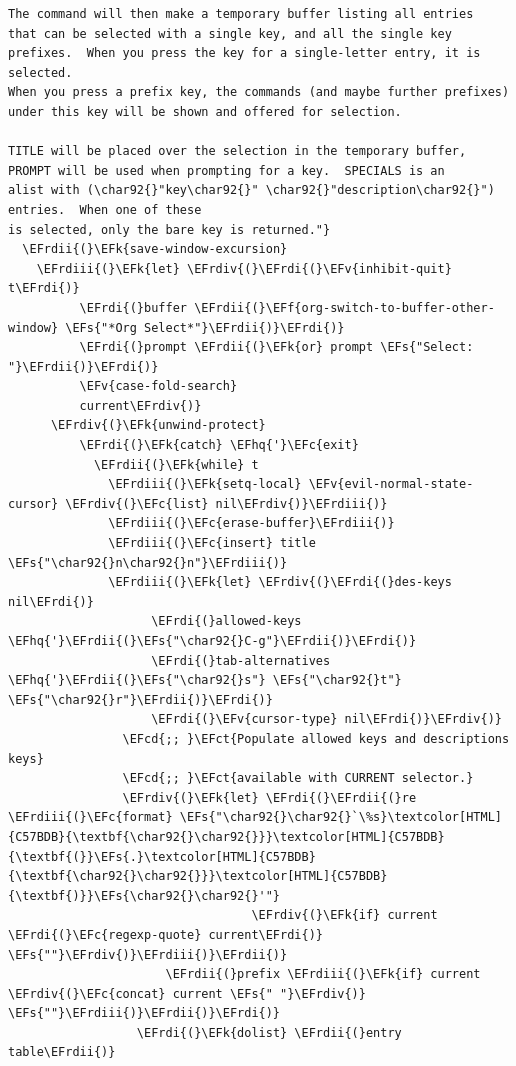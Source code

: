 \documentclass{scrartcl}
\newcommand{\EFk}[1]{\textcolor{EFk}{#1}} %
\newcommand{\EFs}[1]{\textcolor{EFs}{#1}} %
\newcommand{\EFct}[1]{\textcolor{EFct}{#1}} %
\newcommand{\EFc}[1]{\textcolor{EFc}{#1}} %
\newcommand{\EFv}[1]{\textcolor{EFv}{#1}} %
\newcommand{\EFf}[1]{\textcolor{EFf}{#1}} %
\newcommand{\EFcd}[1]{\textcolor{EFcd}{#1}} %
\newcommand{\EFhq}[1]{#1} %
\newcommand{\EFrdi}[1]{#1} %
\newcommand{\EFrdii}[1]{#1} %
\newcommand{\EFrdiii}[1]{#1} %
\newcommand{\EFrdiv}[1]{#1} %
\begin{document}
\begin{Code}
\begin{Verbatim}[]
The command will then make a temporary buffer listing all entries
that can be selected with a single key, and all the single key
prefixes.  When you press the key for a single-letter entry, it is selected.
When you press a prefix key, the commands (and maybe further prefixes)
under this key will be shown and offered for selection.

TITLE will be placed over the selection in the temporary buffer,
PROMPT will be used when prompting for a key.  SPECIALS is an
alist with (\char92{}"key\char92{}" \char92{}"description\char92{}") entries.  When one of these
is selected, only the bare key is returned."}
  \EFrdii{(}\EFk{save-window-excursion}
    \EFrdiii{(}\EFk{let} \EFrdiv{(}\EFrdi{(}\EFv{inhibit-quit} t\EFrdi{)}
          \EFrdi{(}buffer \EFrdii{(}\EFf{org-switch-to-buffer-other-window} \EFs{"*Org Select*"}\EFrdii{)}\EFrdi{)}
          \EFrdi{(}prompt \EFrdii{(}\EFk{or} prompt \EFs{"Select: "}\EFrdii{)}\EFrdi{)}
          \EFv{case-fold-search}
          current\EFrdiv{)}
      \EFrdiv{(}\EFk{unwind-protect}
          \EFrdi{(}\EFk{catch} \EFhq{'}\EFc{exit}
            \EFrdii{(}\EFk{while} t
              \EFrdiii{(}\EFk{setq-local} \EFv{evil-normal-state-cursor} \EFrdiv{(}\EFc{list} nil\EFrdiv{)}\EFrdiii{)}
              \EFrdiii{(}\EFc{erase-buffer}\EFrdiii{)}
              \EFrdiii{(}\EFc{insert} title \EFs{"\char92{}n\char92{}n"}\EFrdiii{)}
              \EFrdiii{(}\EFk{let} \EFrdiv{(}\EFrdi{(}des-keys nil\EFrdi{)}
                    \EFrdi{(}allowed-keys \EFhq{'}\EFrdii{(}\EFs{"\char92{}C-g"}\EFrdii{)}\EFrdi{)}
                    \EFrdi{(}tab-alternatives \EFhq{'}\EFrdii{(}\EFs{"\char92{}s"} \EFs{"\char92{}t"} \EFs{"\char92{}r"}\EFrdii{)}\EFrdi{)}
                    \EFrdi{(}\EFv{cursor-type} nil\EFrdi{)}\EFrdiv{)}
                \EFcd{;; }\EFct{Populate allowed keys and descriptions keys}
                \EFcd{;; }\EFct{available with CURRENT selector.}
                \EFrdiv{(}\EFk{let} \EFrdi{(}\EFrdii{(}re \EFrdiii{(}\EFc{format} \EFs{"\char92{}\char92{}`\%s}\textcolor[HTML]{C57BDB}{\textbf{\char92{}\char92{}}}\textcolor[HTML]{C57BDB}{\textbf{(}}\EFs{.}\textcolor[HTML]{C57BDB}{\textbf{\char92{}\char92{}}}\textcolor[HTML]{C57BDB}{\textbf{)}}\EFs{\char92{}\char92{}'"}
                                  \EFrdiv{(}\EFk{if} current \EFrdi{(}\EFc{regexp-quote} current\EFrdi{)} \EFs{""}\EFrdiv{)}\EFrdiii{)}\EFrdii{)}
                      \EFrdii{(}prefix \EFrdiii{(}\EFk{if} current \EFrdiv{(}\EFc{concat} current \EFs{" "}\EFrdiv{)} \EFs{""}\EFrdiii{)}\EFrdii{)}\EFrdi{)}
                  \EFrdi{(}\EFk{dolist} \EFrdii{(}entry table\EFrdii{)}

\end{Verbatim}
\end{Code}
\end{document}
